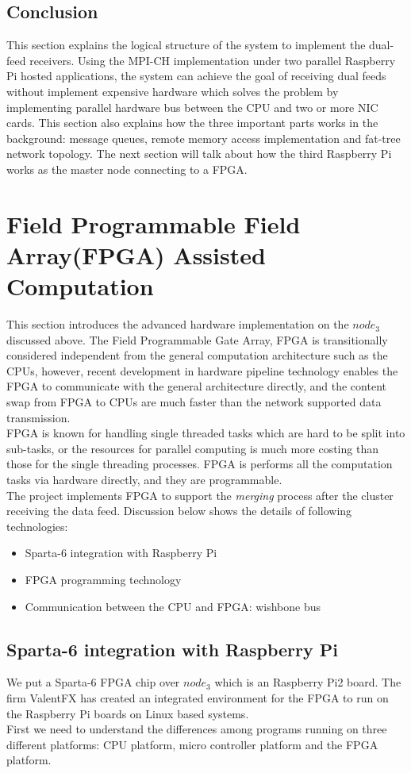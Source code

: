 \documentclass[11pt,openright,a4paper]{report}
\begin{document}
\subsection{Conclusion}
This section explains the logical structure of the system to implement the dual-feed receivers. Using the MPI-CH implementation under two parallel Raspberry Pi hosted applications, the system can achieve the goal of receiving dual feeds without implement expensive hardware which solves the problem by implementing parallel hardware bus between the CPU and two or more NIC cards. This section also explains how the three important parts works in the background: message queues, remote memory access implementation and fat-tree network topology. The next section will talk about how the third Raspberry Pi works as the master node connecting to a FPGA.\\
\section{Field Programmable Field Array(FPGA) Assisted Computation}
This section introduces the advanced hardware implementation on the $node_{3}$ discussed above. The Field Programmable Gate Array, FPGA is transitionally considered independent from the general computation architecture such as the CPUs, however, recent development in hardware pipeline technology enables the FPGA to communicate with the general architecture directly, and the content swap from FPGA to CPUs are much faster than the network supported data transmission.\\
FPGA is known for handling single threaded tasks which are hard to be split into sub-tasks, or the resources for parallel computing is much more costing than those for the single threading processes. FPGA is performs all the computation tasks via hardware directly, and they are programmable.\\
The project implements FPGA to support the \textit{merging} process after the cluster receiving the data feed. Discussion below shows the details of following technologies:
\begin{itemize}
	\item Sparta-6 integration with Raspberry Pi
	\item FPGA programming technology
	\item Communication between the CPU and FPGA: wishbone bus
\end{itemize}
\subsection{Sparta-6 integration with Raspberry Pi}
We put a Sparta-6 FPGA chip over $node_{3}$ which is an Raspberry Pi2 board. The firm ValentFX has created an integrated environment for the FPGA to run on the Raspberry Pi boards on Linux based systems. \\
First we need to understand the differences among programs running on three different platforms: CPU platform, micro controller platform and the FPGA platform. \\
\end{document}
